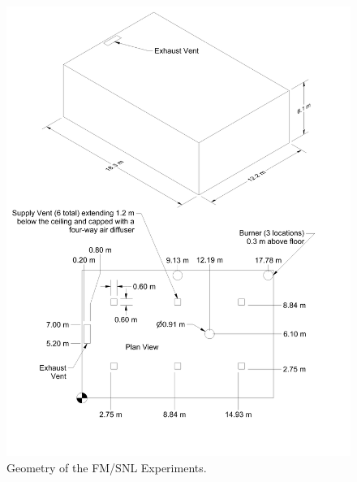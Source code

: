 \begin{figure}
\begin{center}
\includegraphics[height=6.in]{FIGURES/FM_SNL/FM_SNL_Drawing}
\end{center}
\caption[Geometry of the FM/SNL Experiments]{Geometry of the FM/SNL Experiments.}
\label{FM_SNL_Drawing}
\end{figure}

\clearpage


